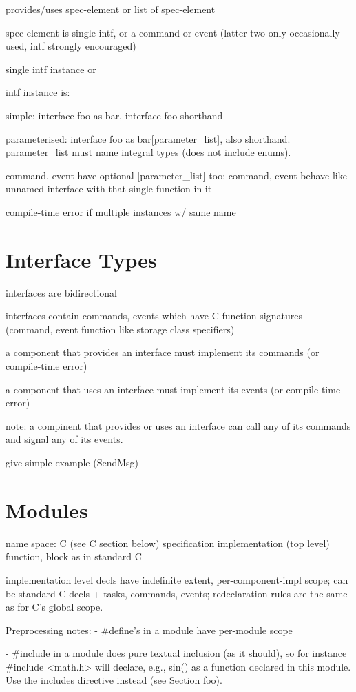 \documentclass[11pt]{article}
\begin{document}
provides/uses spec-element or { list of spec-element }

spec-element is single intf, or a command or event (latter two only
occasionally used, intf strongly encouraged)

single intf instance or 

intf instance is:

simple: interface foo as bar, interface foo shorthand

parameterised: interface foo as bar[parameter_list], also shorthand.
parameter_list must name integral types (does not include enums).

command, event have optional [parameter_list] too; command, event
behave like unnamed interface with that single function in it

compile-time error if multiple instances w/ same name

\section{Interface Types}

interfaces are bidirectional

interfaces contain commands, events which have C function signatures
(command, event function like storage class specifiers)

a component that provides an interface must implement its commands 
(or compile-time error)

a component that uses an interface must implement its events 
(or compile-time error)

note: a compinent that provides or uses an interface can call any
of its commands and signal any of its events.

give simple example (SendMsg)

\section{Modules}

name space:
C (see C section below)
specification
implementation (top level)
function, block as in standard C

implementation level decls have indefinite extent, per-component-impl
scope; can be standard C decls + tasks, commands, events; redeclaration
rules are the same as for C's global scope.

Preprocessing notes:
- #define's in a module have per-module scope

- #include in a module does pure textual inclusion (as it should), so for
instance #include <math.h> will declare, e.g., sin() as a function declared
in this module. Use the includes directive instead (see Section foo).
\end{document}
